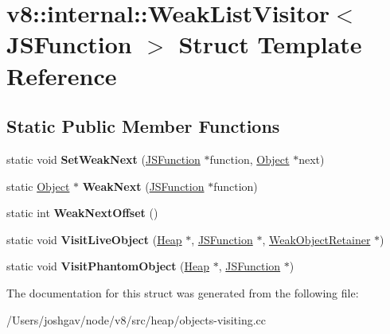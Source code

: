 \hypertarget{structv8_1_1internal_1_1_weak_list_visitor_3_01_j_s_function_01_4}{}\section{v8\+:\+:internal\+:\+:Weak\+List\+Visitor$<$ J\+S\+Function $>$ Struct Template Reference}
\label{structv8_1_1internal_1_1_weak_list_visitor_3_01_j_s_function_01_4}
\subsection*{Static Public Member Functions}
\begin{DoxyCompactItemize}
\item 
static void {\bfseries Set\+Weak\+Next} (\hyperlink{classv8_1_1internal_1_1_j_s_function}{J\+S\+Function} $\ast$function, \hyperlink{classv8_1_1internal_1_1_object}{Object} $\ast$next)\hypertarget{structv8_1_1internal_1_1_weak_list_visitor_3_01_j_s_function_01_4_aef0233a3a148a7684199ed61238c6f72}{}\label{structv8_1_1internal_1_1_weak_list_visitor_3_01_j_s_function_01_4_aef0233a3a148a7684199ed61238c6f72}

\item 
static \hyperlink{classv8_1_1internal_1_1_object}{Object} $\ast$ {\bfseries Weak\+Next} (\hyperlink{classv8_1_1internal_1_1_j_s_function}{J\+S\+Function} $\ast$function)\hypertarget{structv8_1_1internal_1_1_weak_list_visitor_3_01_j_s_function_01_4_a3e2b34db6470d7b0c621e08bb64386c4}{}\label{structv8_1_1internal_1_1_weak_list_visitor_3_01_j_s_function_01_4_a3e2b34db6470d7b0c621e08bb64386c4}

\item 
static int {\bfseries Weak\+Next\+Offset} ()\hypertarget{structv8_1_1internal_1_1_weak_list_visitor_3_01_j_s_function_01_4_a486f8faae8aeb8ed9bee256503d4d22a}{}\label{structv8_1_1internal_1_1_weak_list_visitor_3_01_j_s_function_01_4_a486f8faae8aeb8ed9bee256503d4d22a}

\item 
static void {\bfseries Visit\+Live\+Object} (\hyperlink{classv8_1_1internal_1_1_heap}{Heap} $\ast$, \hyperlink{classv8_1_1internal_1_1_j_s_function}{J\+S\+Function} $\ast$, \hyperlink{classv8_1_1internal_1_1_weak_object_retainer}{Weak\+Object\+Retainer} $\ast$)\hypertarget{structv8_1_1internal_1_1_weak_list_visitor_3_01_j_s_function_01_4_af993eaeceaa43e4dd588746d0844dce2}{}\label{structv8_1_1internal_1_1_weak_list_visitor_3_01_j_s_function_01_4_af993eaeceaa43e4dd588746d0844dce2}

\item 
static void {\bfseries Visit\+Phantom\+Object} (\hyperlink{classv8_1_1internal_1_1_heap}{Heap} $\ast$, \hyperlink{classv8_1_1internal_1_1_j_s_function}{J\+S\+Function} $\ast$)\hypertarget{structv8_1_1internal_1_1_weak_list_visitor_3_01_j_s_function_01_4_a042672f995f4fb8a1ed100a8ad841533}{}\label{structv8_1_1internal_1_1_weak_list_visitor_3_01_j_s_function_01_4_a042672f995f4fb8a1ed100a8ad841533}

\end{DoxyCompactItemize}


The documentation for this struct was generated from the following file\+:\begin{DoxyCompactItemize}
\item 
/\+Users/joshgav/node/v8/src/heap/objects-\/visiting.\+cc\end{DoxyCompactItemize}
